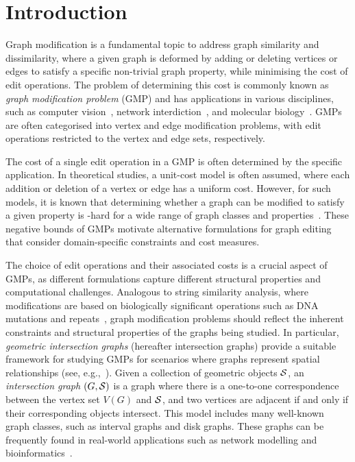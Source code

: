 \section{Introduction}\label{sec:intro}
Graph modification is a fundamental topic to address graph similarity and dissimilarity, where a given graph is deformed by adding or deleting vertices or edges to satisfy a specific non-trivial graph property, while minimising the cost of edit operations. The problem of determining this cost is commonly known as \emph{graph modification problem} (GMP) and has applications in various disciplines, such as computer vision~\cite{Chung1994}, network interdiction~\cite{Hoang2023}, and molecular biology~\cite{Hellmuth2020}. GMPs are often categorised into vertex and edge modification problems, with edit operations restricted to the vertex and edge sets, respectively.

The cost of a single edit operation in a GMP is often determined by the specific application. In theoretical studies, a unit-cost model is often assumed, where each addition or deletion of a vertex or edge has a uniform cost. However, for such models, it is known that determining whether a graph can be modified to satisfy a given property is \NP-hard for a wide range of graph classes and properties~\cite{Lewis1980,Burzyn2006,Fomin2015,Sritharan2016}. These negative bounds of GMPs motivate alternative formulations for graph editing that consider domain-specific constraints and cost measures.%

The choice of edit operations and their associated costs is a crucial aspect of GMPs, as different formulations capture different structural properties and computational challenges. Analogous to string similarity analysis, where modifications are based on biologically significant operations such as DNA mutations and repeats~\cite{Li2009}, graph modification problems should reflect the inherent constraints and structural properties of the graphs being studied. In particular, \emph{geometric intersection graphs} (hereafter intersection graphs) provide a suitable framework for studying GMPs for scenarios where graphs represent spatial relationships (see, e.g.,~\cite{Panolan2024,Berg2019,fomin2023}). Given a collection of geometric objects $\S$, an \emph{intersection graph} $(G,\S)$ is a graph where there is a one-to-one correspondence between the vertex set $V(G)$ and $\S$, and two vertices are adjacent if and only if their corresponding objects intersect. This model includes many well-known graph classes, such as interval graphs and disk graphs. These graphs can be frequently found in real-world applications such as network modelling and bioinformatics~\cite{McKee1999}.

